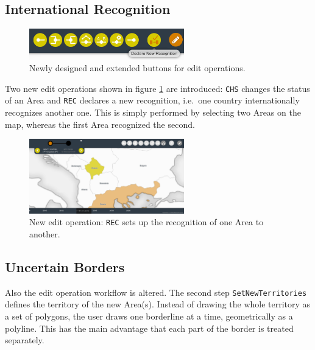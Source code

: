 \subsection{International Recognition} %
\label{sub:international_recognition}

\begin{figure}[ht]
  \centering
  \includegraphics[width = 0.6\textwidth]{graphics/extensions/edit_mode_extension.png}
  \caption{Newly designed and extended buttons for edit operations.}
  \label{fig:edit_mode_extension}
\end{figure}

Two new edit operations shown in figure \ref{fig:edit_mode_extension} are introduced: \texttt{CHS} changes the status of an Area and \texttt{REC} declares a new recognition, i.e.\ one country internationally recognizes another one. This is simply performed by selecting two Areas on the map, whereas the first Area recognized the second.

\begin{figure}[ht]
  \centering
  \includegraphics[width=0.6\textwidth]{graphics/extensions/operation_REC}
  \caption{New edit operation: \texttt{REC} sets up the recognition of one Area to another.}
  \label{fig:uncertainty_operation_REC}
\end{figure}


\subsection{Uncertain Borders} %
\label{sub:uncertain_borders}

Also the edit operation workflow is altered. The second step \texttt{SetNewTerritories} defines the territory of the new Area(s). Instead of drawing the whole territory as a set of polygons, the user draws one borderline at a time, geometrically as a polyline. This has the main advantage that each part of the border is treated separately.

